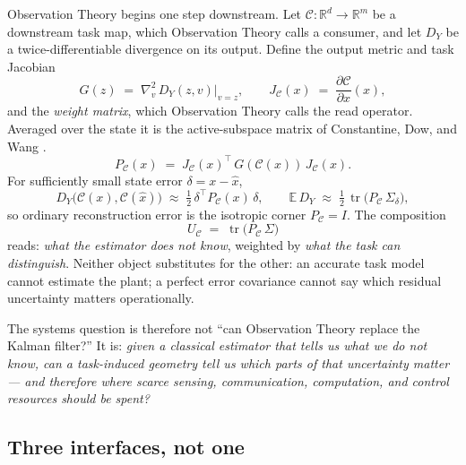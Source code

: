 \documentclass[letterpaper,onecolumn]{IEEEtran}
\theoremstyle{definition}
\theoremstyle{remark}
\newcommand{\E}{\mathbb{E}}
\newcommand{\R}{\mathbb{R}}
\newcommand{\PC}{P_{\mathcal{C}}}
\newcommand{\tr}{\operatorname{tr}}
\newcommand{\C}{\mathcal{C}}
\newcommand{\Sig}{\Sigma}
\newcommand{\UC}{U_{\mathcal{C}}}
\begin{document}
Observation Theory begins one step downstream. Let $\C:\R^d\to\R^m$ be a
downstream task map, which Observation Theory calls a consumer, and let $D_Y$ be a twice-differentiable divergence on its output.
Define the output metric and task Jacobian
\begin{equation}
G(z)\;=\;\nabla_v^2\,D_Y(z,v)\big|_{v=z},
\qquad
J_\C(x)\;=\;\frac{\partial \C}{\partial x}(x),
\end{equation}
and the \emph{weight matrix}, which Observation Theory calls the read
operator. Averaged over the state it is the active-subspace matrix of
Constantine, Dow, and Wang \cite{cdw2014,constantine2015}.
\begin{equation}
\label{eq:pullback}
\boxed{\;\PC(x)\;=\;J_\C(x)^{\top}\,G(\C(x))\,J_\C(x).\;}
\end{equation}
For sufficiently small state error $\delta=x-\hat x$,
\begin{equation}
D_Y\!\big(\C(x),\C(\hat x)\big)\;\approx\;\tfrac12\,\delta^{\top}\PC(x)\,\delta,
\qquad
\E\,D_Y \;\approx\; \tfrac12\,\tr\!\big(\PC\,\Sig_\delta\big),
\end{equation}
so ordinary reconstruction error is the isotropic corner $\PC=I$. The
composition
\begin{equation}
\label{eq:composition}
\UC \;=\; \tr\!\big(\PC\,\Sig\big)
\end{equation}
reads: \emph{what the estimator does not know}, weighted by \emph{what the
task can distinguish}. Neither object substitutes for the other: an
accurate task model cannot estimate the plant; a perfect error covariance
cannot say which residual uncertainty matters operationally.

The systems question is therefore not ``can Observation Theory replace the
Kalman filter?'' It is: \emph{given a classical estimator that tells us what
we do not know, can a task-induced geometry tell us which parts of that
uncertainty matter --- and therefore where scarce sensing, communication,
computation, and control resources should be spent?}

\subsection{Three interfaces, not one}
\label{sec:interfaces}
\end{document}
